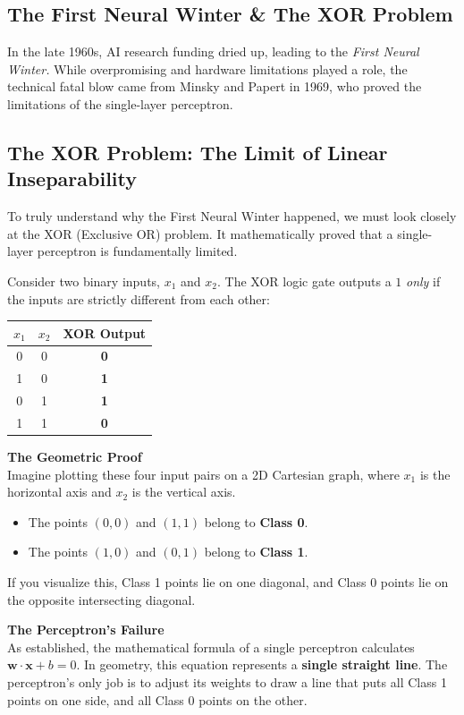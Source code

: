 \documentclass[11pt]{article}
\theoremstyle{smallexample}
\newcommand{\vs}{\vspace{0.2\baselineskip}}
\begin{document}
\subsection{The First Neural Winter \& The XOR Problem}
In the late 1960s, AI research funding dried up, leading to the \textit{First Neural Winter.} While overpromising and hardware limitations played a role, the technical fatal blow came from Minsky and Papert in 1969, who proved the limitations of the single-layer perceptron.

\subsection{The XOR Problem: The Limit of Linear Inseparability}
To truly understand why the First Neural Winter happened, we must look closely at the XOR (Exclusive OR) problem. It mathematically proved that a single-layer perceptron is fundamentally limited.


Consider two binary inputs, $x_1$ and $x_2$. The XOR logic gate outputs a $1$ \textit{only} if the inputs are strictly different from each other:
\begin{center}
\begin{tabular}{|c|c|c|}
\hline
$x_1$ & $x_2$ & \textbf{XOR Output} \\
\hline
0 & 0 & \textbf{0} \\
1 & 0 & \textbf{1} \\
0 & 1 & \textbf{1} \\
1 & 1 & \textbf{0} \\
\hline
\end{tabular}
\end{center}

\vs

\textbf{The Geometric Proof}\\
Imagine plotting these four input pairs on a 2D Cartesian graph, where $x_1$ is the horizontal axis and $x_2$ is the vertical axis.
\begin{itemize}
    \item The points $(0,0)$ and $(1,1)$ belong to \textbf{Class 0}.
    \item The points $(1,0)$ and $(0,1)$ belong to \textbf{Class 1}.
\end{itemize}
If you visualize this, Class 1 points lie on one diagonal, and Class 0 points lie on the opposite intersecting diagonal. 

\vs
\textbf{The Perceptron's Failure}\\
As established, the mathematical formula of a single perceptron calculates $\mathbf{w} \cdot \mathbf{x} + b = 0$. In geometry, this equation represents a \textbf{single straight line}. The perceptron's only job is to adjust its weights to draw a line that puts all Class 1 points on one side, and all Class 0 points on the other. 
\end{document}
